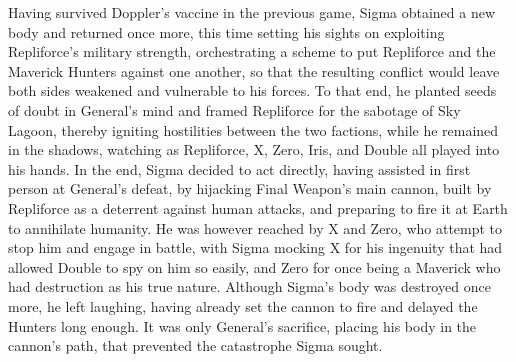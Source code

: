 Having survived Doppler’s vaccine in the previous game, Sigma obtained a new body and returned once more, this time setting his sights on exploiting Repliforce’s military strength, orchestrating a scheme to put Repliforce and the Maverick Hunters against one another, so that the resulting conflict would leave both sides weakened and vulnerable to his forces. To that end, he planted seeds of doubt in General’s mind and framed Repliforce for the sabotage of Sky Lagoon, thereby igniting hostilities between the two factions, while he remained in the shadows, watching as Repliforce, X, Zero, Iris, and Double all played into his hands. In the end, Sigma decided to act directly, having assisted in first person at General's defeat, by hijacking Final Weapon’s main cannon, built by Repliforce as a deterrent against human attacks, and preparing to fire it at Earth to annihilate humanity.  He was however reached by X and Zero, who attempt to stop him and engage in battle, with Sigma mocking X for his ingenuity that had allowed Double to spy on him so easily, and Zero for once being a Maverick who had destruction as his true nature. Although Sigma’s body was destroyed once more, he left laughing, having already set the cannon to fire and delayed the Hunters long enough. It was only General’s sacrifice, placing his body in the cannon’s path, that prevented the catastrophe Sigma sought.


